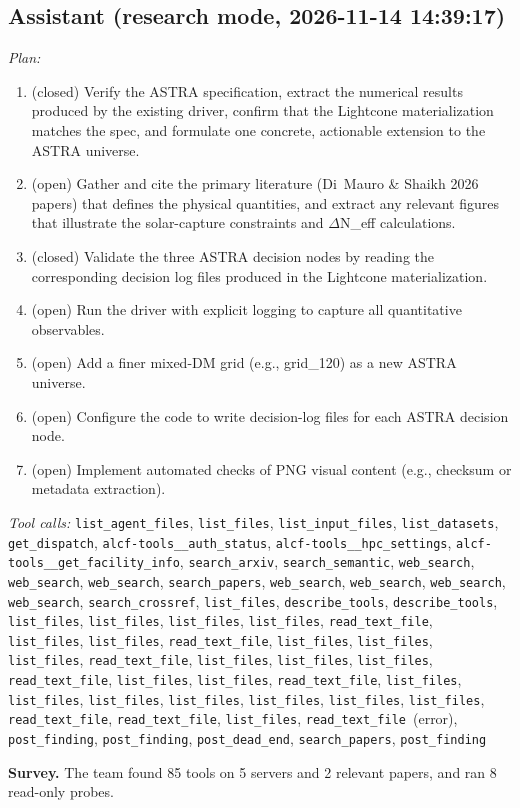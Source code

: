\documentclass[11pt,a4paper]{article}
\begin{document}
\subsection*{Assistant \small(research mode, 2026-11-14 14:39:17)}
\textit{Plan:}\begin{enumerate}
  \item (closed) Verify the ASTRA specification, extract the numerical results produced by the existing driver, confirm that the Lightcone materialization matches the spec, and formulate one concrete, actionable extension to the ASTRA universe.
  \item (open) Gather and cite the primary literature (Di~Mauro \& Shaikh 2026 papers) that defines the physical quantities, and extract any relevant figures that illustrate the solar-capture constraints and $\Delta$N\_eff calculations.
  \item (closed) Validate the three ASTRA decision nodes by reading the corresponding decision log files produced in the Lightcone materialization.
  \item (open) Run the driver with explicit logging to capture all quantitative observables.
  \item (open) Add a finer mixed-DM grid (e.g., grid\_120) as a new ASTRA universe.
  \item (open) Configure the code to write decision-log files for each ASTRA decision node.
  \item (open) Implement automated checks of PNG visual content (e.g., checksum or metadata extraction).
\end{enumerate}
\textit{Tool calls:} \texttt{list\_agent\_files}, \texttt{list\_files}, \texttt{list\_input\_files}, \texttt{list\_datasets}, \texttt{get\_dispatch}, \texttt{alcf-tools\_\_auth\_status}, \texttt{alcf-tools\_\_hpc\_settings}, \texttt{alcf-tools\_\_get\_facility\_info}, \texttt{search\_arxiv}, \texttt{search\_semantic}, \texttt{web\_search}, \texttt{web\_search}, \texttt{web\_search}, \texttt{search\_papers}, \texttt{web\_search}, \texttt{web\_search}, \texttt{web\_search}, \texttt{web\_search}, \texttt{search\_crossref}, \texttt{list\_files}, \texttt{describe\_tools}, \texttt{describe\_tools}, \texttt{list\_files}, \texttt{list\_files}, \texttt{list\_files}, \texttt{list\_files}, \texttt{read\_text\_file}, \texttt{list\_files}, \texttt{list\_files}, \texttt{read\_text\_file}, \texttt{list\_files}, \texttt{list\_files}, \texttt{list\_files}, \texttt{read\_text\_file}, \texttt{list\_files}, \texttt{list\_files}, \texttt{list\_files}, \texttt{read\_text\_file}, \texttt{list\_files}, \texttt{list\_files}, \texttt{read\_text\_file}, \texttt{list\_files}, \texttt{list\_files}, \texttt{list\_files}, \texttt{list\_files}, \texttt{list\_files}, \texttt{list\_files}, \texttt{list\_files}, \texttt{read\_text\_file}, \texttt{read\_text\_file}, \texttt{list\_files}, \texttt{read\_text\_file}~(error), \texttt{post\_finding}, \texttt{post\_finding}, \texttt{post\_dead\_end}, \texttt{search\_papers}, \texttt{post\_finding}\par
\textbf{Survey.} The team found 85 tools on 5 servers and 2 relevant papers, and ran 8 read-only probes.
\end{document}
